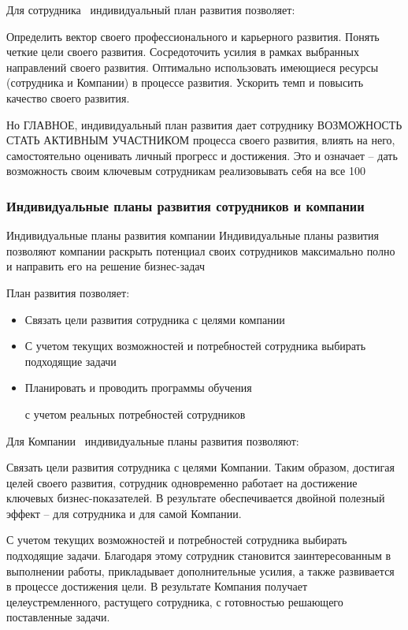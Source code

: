 \documentclass{../industrial-development}
\begin{document}
\lecturenotes

Для сотрудника~\cite{IPl} индивидуальный план развития позволяет:

          Определить вектор своего профессионального и карьерного развития. Понять четкие цели своего развития. 
	Сосредоточить усилия в рамках выбранных направлений своего развития. 
	Оптимально использовать имеющиеся ресурсы (сотрудника и Компании) в процессе развития. 
	Ускорить темп и повысить качество своего развития. 

Но ГЛАВНОЕ, индивидуальный план развития дает сотруднику ВОЗМОЖНОСТЬ СТАТЬ АКТИВНЫМ УЧАСТНИКОМ процесса своего развития, влиять на него, самостоятельно оценивать личный прогресс и достижения. Это и означает – дать возможность своим ключевым сотрудникам реализовывать себя на все 100%


\begin{frame} \frametitle{Индивидуальные планы развития сотрудников и компании}
  \begin{block}{Индивидуальные планы развития компании}
Индивидуальные планы развития позволяют компании раскрыть потенциал своих сотрудников максимально полно и направить его на решение бизнес-задач
  \end{block}

  \bigskip
  План развития позволяет:
   \begin{itemize}
  \item Связать цели развития сотрудника с целями компании
  \item С учетом текущих возможностей и потребностей сотрудника выбирать подходящие задачи
  \item	 Планировать и проводить программы обучения 

с учетом реальных потребностей сотрудников 
  \end{itemize}
\end{frame}

\lecturenotes

Для Компании~\cite{IPl} индивидуальные планы развития позволяют:

	Связать цели развития сотрудника с целями Компании. Таким образом, достигая целей своего развития, сотрудник одновременно работает на достижение ключевых бизнес-показателей. В результате обеспечивается двойной полезный эффект – для сотрудника и для самой Компании.

	С учетом текущих возможностей и потребностей сотрудника выбирать подходящие задачи. Благодаря этому сотрудник становится заинтересованным в выполнении работы, прикладывает дополнительные усилия, а также развивается в процессе достижения цели. В результате Компания получает целеустремленного, растущего сотрудника, с готовностью решающего поставленные задачи.
\end{document}
